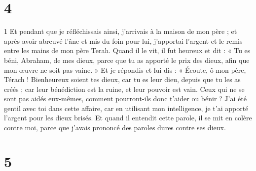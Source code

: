\chapter{4}

\par 1 Et pendant que je réfléchissais ainsi, j'arrivais à la maison de mon père ; et après avoir abreuvé l'âne et mis du foin pour lui, j'apportai l'argent et le remis entre les mains de mon père Terah. Quand il le vit, il fut heureux et dit : « Tu es béni, Abraham, de mes dieux, parce que tu as apporté le prix des dieux, afin que mon œuvre ne soit pas vaine. » Et je répondis et lui dis : « Écoute, ô mon père, Térach ! Bienheureux soient tes dieux, car tu es leur dieu, depuis que tu les as créés ; car leur bénédiction est la ruine, et leur pouvoir est vain. Ceux qui ne se sont pas aidés eux-mêmes, comment pourront-ils donc t'aider ou bénir ? J'ai été gentil avec toi dans cette affaire, car en utilisant mon intelligence, je t'ai apporté l'argent pour les dieux brisés. Et quand il entendit cette parole, il se mit en colère contre moi, parce que j'avais prononcé des paroles dures contre ses dieux.

\chapter{5}

